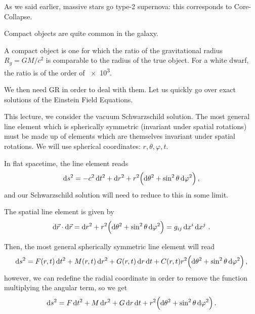 \documentclass[main.tex]{subfiles}
\begin{document}

As we said earlier, massive stars go type-2 supernova: this corresponds to Core-Collapse. 

Compact objects are quite common in the galaxy. 


A compact object is one for which the ratio of the gravitational radius \(R_g = GM / c^2\) is comparable to the radius of the true object.
For a white dwarf, the ratio is of the order of \num{e3}.

We then need GR in order to deal with them. 
Let us quickly go over exact solutions of the Einstein Field Equations.

This lecture, we consider the vacuum Schwarzschild solution.
The most general line element which is spherically symmetric (invariant under spatial rotations) 
must be made up of elements which are themselves invariant under spatial rotations. 
We will use spherical coordinates: \(r, \theta , \varphi , t\). 

In flat spacetime, the line element reads 
%
\begin{align}
\dd{s^2} = - c^2 \dd{t^2} + \dd{r^2} + r^2 \qty( \dd{\theta^2} + \sin^2 \theta \dd{\varphi^2})
\,,
\end{align}
%
and our Schwarzschild solution will need to reduce to this in some limit.

The spatial line element is given by 
%
\begin{align}
\dd{\vec{r}} \cdot \dd{\vec{r}} =  \dd{r^2} + r^2 \qty( \dd{\theta^2} + \sin^2 \theta \dd{\varphi^2}) = g_{ij} \dd{x^{i}} \dd{x^{j}}
\,.
\end{align}

Then, the most general spherically symmetric line element will read 
%
\begin{align}
\dd{s^2} =  F(r ,t) \dd{t^2} + M(r, t) \dd{r^2} + G(r, t) \dd{r} \dd{t} + C(r, t) r^2 \qty( \dd{\theta^2} + \sin^2 \theta \dd{\varphi^2})
\,,
\end{align}
%
however, we can redefine the radial coordinate in order to remove the function multiplying the angular term, so we get 
%
\begin{align}
\dd{s^2} = F \dd{t^2} + M \dd{r^2}  + G \dd{r} \dd{t} 
+ r^2 \qty(\dd{\theta^2} + \sin^2\theta \dd{\varphi^2}) 
\,.
\end{align}
\end{document}
